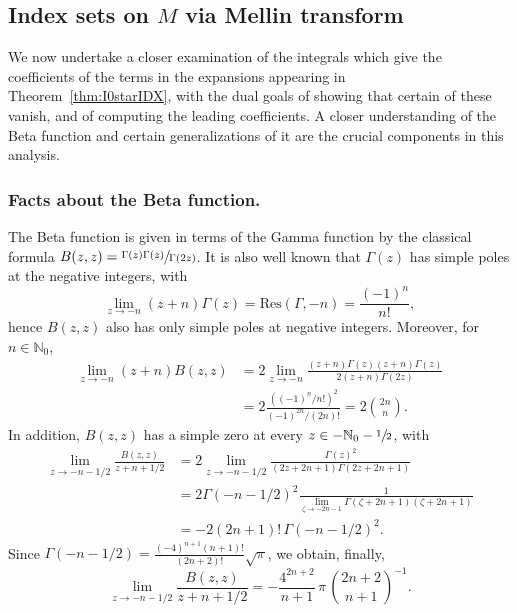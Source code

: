\documentclass[JEP,XML,SOM,Unicode,NoFloatCountersInSection, NoEqCountersInSection,published]{cedram}
\theoremstyle{plain}
\theoremstyle{definition}
\theoremstyle{remark}
\def\Nm{{\mathbb{N}}}
\begin{document}
\subsection{Index sets on $M$ via Mellin transform} \label{sec:MellinBeta}

We now undertake a closer examination of the integrals which give the coefficients of the terms in the expansions appearing in
Theorem~\ref{thm:I0starIDX}, with the dual goals of showing that certain of these vanish, and of computing the leading coefficients.
A closer understanding of the Beta function and certain generalizations of it are the crucial components in this analysis.

\label{sec:beta}

\subsubsection*{Facts about the Beta function.} The Beta function is given in terms of the Gamma function by the classical formula
$B(z,z) = \sfrac{\Gamma(z)\Gamma(z)}{\Gamma(2z)}$. It is also well known that $\Gamma(z)$ has simple poles at the
negative integers, with
\[
\lim_{z\to -n} (z+n) \Gamma(z) = \mathrm{Res}(\Gamma, -n) = \frac{(-1)^n}{n!},
\]
hence $B(z,z)$ also
has only simple poles at negative integers. Moreover, for $n \in \mathbb N_0$,
\begin{equation}\label{eq:residueB}
\begin{aligned}
\lim_{z\to -n} (z+n) B(z,z) &= 2\lim_{z\to -n} \frac{(z+n) \Gamma(z) (z+n)\Gamma(z)}{2(z+n) \Gamma(2z)}\\
&=2 \frac{((-1)^n/n!)^2}{(-1)^{2n}/ (2n)! } = 2 \binom{2n}{n}.
\end{aligned}
\end{equation}
In addition, $B(z,z)$ has a simple zero at every $z \in -\Nm_0-\sfrac{1}{2}$, with
\begin{align*}
\lim_{z\to -n-1/2} \frac{B(z,z)}{z+n+1/2} &= 2\lim_{z\to -n-1/2} \frac{\Gamma(z)^2}{(2z+2n+1)\Gamma(2z+2n+1)} \\
&= 2\Gamma(-n-1/2)^2 \frac{1}{\lim_{\zeta\to -2n-1} \Gamma(\zeta+2n+1)(\zeta+2n+1)} \\
&= -2 (2n+1) ! \, \Gamma(-n-1/2)^2.
\end{align*}
Since $\Gamma(-n-1/2) = \frac{(-4)^{n+1} (n+1)!}{(2n+2)!} \sqrt{\pi}$, we obtain, finally,
\begin{equation}
\lim_{z\to -n-1/2} \frac{B(z,z)}{z+n+1/2} = -\frac{4^{2n+2}}{n+1} \, \pi \, \binom{2n+2}{n+1}^{-1}.
\label{eq:antiresidue}
\end{equation}
\end{document}
